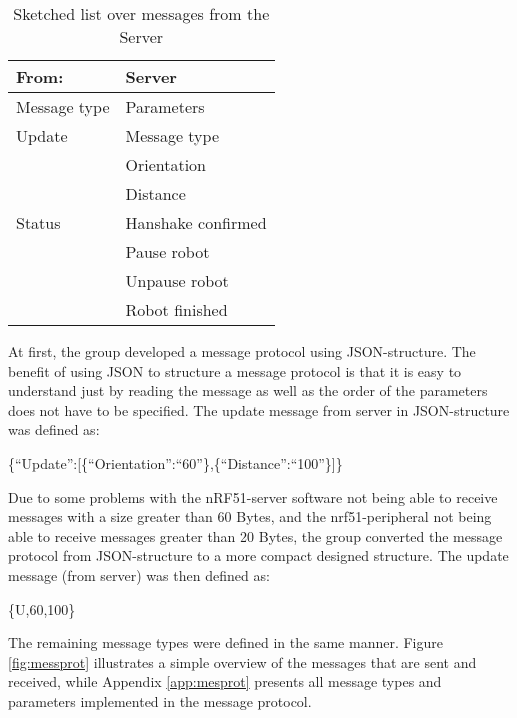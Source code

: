 \begin{table}[ht]
\begin{center}
 \begin{tabular}{|l | l|} 
 \hline
 From: & \textbf{Server}\\
 \hline
 \hline
 Message type       &    Parameters \\
 \hline

 Update              &   Message type \\
                    &   Orientation \\
                    &   Distance \\
 \hline
 Status                &   Hanshake confirmed \\
                    &   Pause robot \\
                    &   Unpause robot \\
                    &   Robot finished \\
 \hline
\end{tabular}
\end{center}
\caption{Sketched list over messages from the Server}
\label{tab:messprotfromser}
\end{table}

At first, the group developed a message protocol using JSON-structure. The benefit of using JSON to structure a message protocol is that it is easy to understand just by reading the message as well as the order of the parameters does not have to be specified. The update message from server in JSON-structure was defined as:

\{``Update'':[\{``Orientation'':``60''\},\{``Distance'':``100''\}]\}

Due to some problems with the nRF51-server software not being able to receive messages with a size greater than 60 Bytes, and the nrf51-peripheral not being able to receive messages greater than 20 Bytes, the group converted the message protocol from JSON-structure to a more compact designed structure. The update message (from server) was then defined as:

\{U,60,100\}

The remaining message types were defined in the same manner. Figure \ref{fig:messprot} illustrates a simple overview of the messages that are sent and received, while Appendix \ref{app:mesprot} presents all message types and parameters implemented in the message protocol.


